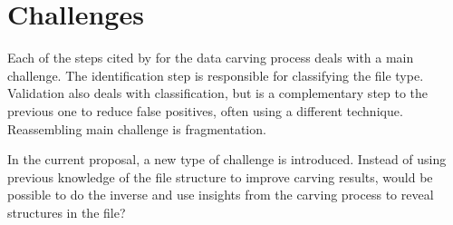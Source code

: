 \section{Challenges}

Each of the steps cited by \cite{ali_review_2018} for the data carving process deals with a main challenge. The identification step is responsible for classifying the file type. Validation also deals with classification, but is a complementary step to the previous one to reduce false positives, often using a different technique. Reassembling main challenge is fragmentation.

In the current proposal, a new type of challenge is introduced. Instead of using previous knowledge of the file structure to improve carving results, would be possible to do the inverse and use insights from the carving process to reveal structures in the file?




